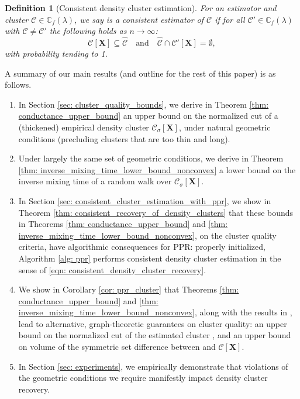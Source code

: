 \documentclass{article}
\newcommand{\1}{\mathbf{1}}
\newcommand{\Xbf}{\mathbf{X}}
\newcommand{\Cbb}{\mathbb{C}}
\newcommand{\Cset}{\mathcal{C}}
\newcommand{\Csig}{\Cset_{\sigma}}
\theoremstyle{aldenthm}
\newtheorem{definition}{Definition}
\theoremstyle{aldenrmrk}
\begin{document}
\begin{definition}[Consistent density cluster estimation]
\label{def: consistent_density_cluster_estimation}
For an estimator \smash{$\widehat{\Cset} \subseteq \Xbf$} and cluster 
$\Cset \in \Cbb_f(\lambda)$, we say \smash{$\widehat{\Cset}$} is a consistent
estimator of $\Cset$ if for all $\Cset' \in \Cbb_f(\lambda)$ with $\Cset \not=
\Cset'$ the following holds as $n \to \infty$: 
\begin{equation}
\label{eqn: consistent_density_cluster_recovery}
\Cset[\Xbf] \subseteq \widehat{\Cset} \quad \text{and} \quad
\widehat{\Cset} \cap \Cset'[\Xbf] = \emptyset,
\end{equation}
with probability tending to 1.
\end{definition}

A summary of our main results (and outline for the rest of this paper) is as
follows.  

\begin{enumerate}
\item In Section \ref{sec: cluster_quality_bounds}, we derive in Theorem
  \ref{thm: conductance_upper_bound} an upper bound on the normalized cut of a  
  (thickened) empirical density cluster $\Csig[\Xbf]$, under natural geometric 
  conditions (precluding clusters that are too thin and long).  

\item Under largely the same set of geometric conditions, we derive in Theorem
  \ref{thm: inverse_mixing_time_lower_bound_nonconvex} a lower bound on the
  inverse mixing time of a random walk over $\Csig[\Xbf]$.
	
\item In Section \ref{sec: consistent_cluster_estimation_with_ppr}, we show in
  Theorem \ref{thm: consistent_recovery_of_density_clusters} that these bounds
  in Theorems \ref{thm: conductance_upper_bound} and \ref{thm:
    inverse_mixing_time_lower_bound_nonconvex},
  on the cluster quality criteria, have algorithmic consequences for PPR:
  properly initialized, Algorithm \ref{alg: ppr} performs consistent density
  cluster estimation in the sense of \eqref{eqn:
    consistent_density_cluster_recovery}. 
	
\item We show in Corollary \ref{cor: ppr_cluster} that Theorems \ref{thm:
    conductance_upper_bound} and \ref{thm:
    inverse_mixing_time_lower_bound_nonconvex}, along with the results in 
  \citep{zhu2013}, lead to alternative, graph-theoretic guarantees on cluster 
  quality: an upper bound on the normalized cut of the estimated cluster 
  , and an upper bound on volume of the symmetric set
  difference between  and $\Cset[\Xbf]$.    

\item In Section \ref{sec: experiments}, we empirically
  demonstrate that violations of the geometric conditions we require manifestly
  impact density cluster recovery. 
\end{enumerate}
\end{document}
